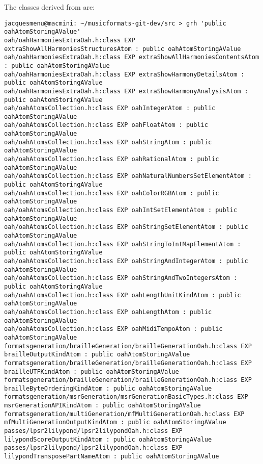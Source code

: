 The classes derived from  are:
\begin{lstlisting}[language=Terminal]
jacquesmenu@macmini: ~/musicformats-git-dev/src > grh 'public oahAtomStoringAValue'
oah/oahHarmoniesExtraOah.h:class EXP extraShowAllHarmoniesStructuresAtom : public oahAtomStoringAValue
oah/oahHarmoniesExtraOah.h:class EXP extraShowAllHarmoniesContentsAtom : public oahAtomStoringAValue
oah/oahHarmoniesExtraOah.h:class EXP extraShowHarmonyDetailsAtom : public oahAtomStoringAValue
oah/oahHarmoniesExtraOah.h:class EXP extraShowHarmonyAnalysisAtom : public oahAtomStoringAValue
oah/oahAtomsCollection.h:class EXP oahIntegerAtom : public oahAtomStoringAValue
oah/oahAtomsCollection.h:class EXP oahFloatAtom : public oahAtomStoringAValue
oah/oahAtomsCollection.h:class EXP oahStringAtom : public oahAtomStoringAValue
oah/oahAtomsCollection.h:class EXP oahRationalAtom : public oahAtomStoringAValue
oah/oahAtomsCollection.h:class EXP oahNaturalNumbersSetElementAtom : public oahAtomStoringAValue
oah/oahAtomsCollection.h:class EXP oahColorRGBAtom : public oahAtomStoringAValue
oah/oahAtomsCollection.h:class EXP oahIntSetElementAtom : public oahAtomStoringAValue
oah/oahAtomsCollection.h:class EXP oahStringSetElementAtom : public oahAtomStoringAValue
oah/oahAtomsCollection.h:class EXP oahStringToIntMapElementAtom : public oahAtomStoringAValue
oah/oahAtomsCollection.h:class EXP oahStringAndIntegerAtom : public oahAtomStoringAValue
oah/oahAtomsCollection.h:class EXP oahStringAndTwoIntegersAtom : public oahAtomStoringAValue
oah/oahAtomsCollection.h:class EXP oahLengthUnitKindAtom : public oahAtomStoringAValue
oah/oahAtomsCollection.h:class EXP oahLengthAtom : public oahAtomStoringAValue
oah/oahAtomsCollection.h:class EXP oahMidiTempoAtom : public oahAtomStoringAValue
formatsgeneration/brailleGeneration/brailleGenerationOah.h:class EXP brailleOutputKindAtom : public oahAtomStoringAValue
formatsgeneration/brailleGeneration/brailleGenerationOah.h:class EXP brailleUTFKindAtom : public oahAtomStoringAValue
formatsgeneration/brailleGeneration/brailleGenerationOah.h:class EXP brailleByteOrderingKindAtom : public oahAtomStoringAValue
formatsgeneration/msrGeneration/msrGenerationBasicTypes.h:class EXP msrGenerationAPIKindAtom : public oahAtomStoringAValue
formatsgeneration/multiGeneration/mfMultiGenerationOah.h:class EXP mfMultiGenerationOutputKindAtom : public oahAtomStoringAValue
passes/lpsr2lilypond/lpsr2lilypondOah.h:class EXP lilypondScoreOutputKindAtom : public oahAtomStoringAValue
passes/lpsr2lilypond/lpsr2lilypondOah.h:class EXP lilypondTransposePartNameAtom : public oahAtomStoringAValue

\end{lstlisting}
